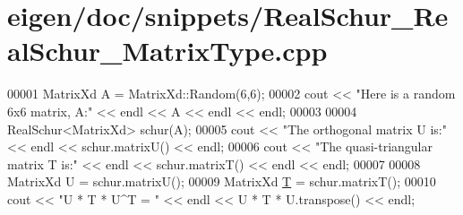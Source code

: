 \hypertarget{eigen_2doc_2snippets_2_real_schur___real_schur___matrix_type_8cpp_source}{}\section{eigen/doc/snippets/\+Real\+Schur\+\_\+\+Real\+Schur\+\_\+\+Matrix\+Type.cpp}
\label{eigen_2doc_2snippets_2_real_schur___real_schur___matrix_type_8cpp_source}

\begin{DoxyCode}
00001 MatrixXd A = MatrixXd::Random(6,6);
00002 cout << \textcolor{stringliteral}{"Here is a random 6x6 matrix, A:"} << endl << A << endl << endl;
00003 
00004 RealSchur<MatrixXd> schur(A);
00005 cout << \textcolor{stringliteral}{"The orthogonal matrix U is:"} << endl << schur.matrixU() << endl;
00006 cout << \textcolor{stringliteral}{"The quasi-triangular matrix T is:"} << endl << schur.matrixT() << endl << endl;
00007 
00008 MatrixXd U = schur.matrixU();
00009 MatrixXd \hyperlink{group___sparse_core___module_class_eigen_1_1_triplet}{T} = schur.matrixT();
00010 cout << \textcolor{stringliteral}{"U * T * U^T = "} << endl << U * T * U.transpose() << endl;
\end{DoxyCode}
